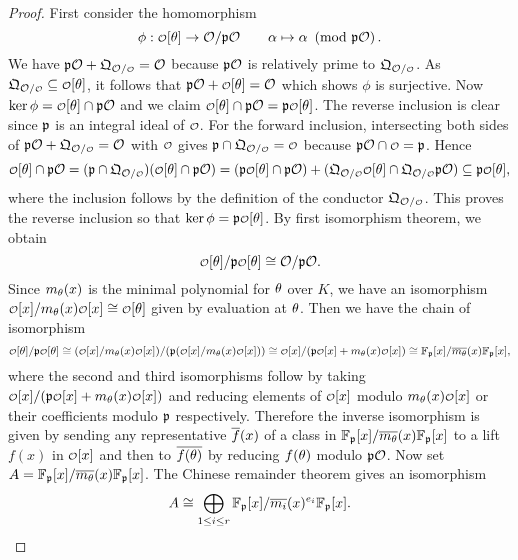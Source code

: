     \begin{proof}
      First consider the homomorphism
      \[
        \phi:\smc{O}[\t] \to \mc{O}/\mf{p}\mc{O} \qquad \a \mapsto \a \tmod{\mf{p}\mc{O}}.
      \]
      We have $\mf{p}\mc{O}+\mf{Q}_{\mc{O}/\smc{O}} = \mc{O}$ because $\mathfrak{p}\mathcal{O}$ is relatively prime to $\mf{Q}_{\mc{O}/\smc{O}}$. As $\mf{Q}_{\mc{O}/\smc{O}} \subseteq \smc{O}[\t]$, it follows that $\mf{p}\mc{O}+\smc{O}[\t] = \mc{O}$ which shows $\phi$ is surjective. Now $\ker\phi = \smc{O}[\t] \cap \mf{p}\mc{O}$ and we claim $\smc{O}[\t] \cap \mf{p}\mc{O} = \mf{p}\smc{O}[\t]$. The reverse inclusion is clear since $\mathfrak{p}$ is an integral ideal of $\smc{O}$. For the forward inclusion, intersecting both sides of $\mf{p}\mc{O}+\mf{Q}_{\mc{O}/\smc{O}} = \mc{O}$ with $\smc{O}$ gives $\mf{p} \cap \mf{Q}_{\mc{O}/\smc{O}} = \smc{O}$ because $\mf{p}\mc{O} \cap \smc{O} = \mf{p}$. Hence
      \[
        \smc{O}[\t] \cap \mf{p}\mc{O} = (\mf{p} \cap \mf{Q}_{\mc{O}/\smc{O}})(\smc{O}[\t] \cap \mf{p}\mc{O}) = (\mf{p}\smc{O}[\t] \cap \mf{p}\mc{O})+(\mf{Q}_{\mc{O}/\smc{O}}\smc{O}[\t] \cap \mf{Q}_{\mc{O}/\smc{O}}\mf{p}\mc{O}) \subseteq \mf{p}\smc{O}[\t],
      \]
      where the inclusion follows by the definition of the conductor $\mf{Q}_{\mc{O}/\smc{O}}$. This proves the reverse inclusion so that $\ker\phi = \mf{p}\smc{O}[\t]$. By first isomorphism theorem, we obtain
      \[
        \smc{O}[\t]/\mf{p}\smc{O}[\t] \cong \mc{O}/\mf{p}\mc{O}.
      \]
      Since $m_{\theta}(x)$ is the minimal polynomial for $\theta$ over $K$, we have an isomorphism $\smc{O}[x]/m_{\t}(x)\smc{O}[x] \cong \smc{O}[\t]$ given by evaluation at $\theta$. Then we have the chain of isomorphism
      \[
        \smc{O}[\t]/\mf{p}\smc{O}[\t] \cong (\smc{O}[x]/m_{\t}(x)\smc{O}[x])/(\mf{p}(\smc{O}[x]/m_{\t}(x)\smc{O}[x])) \cong \smc{O}[x]/(\mf{p}\smc{O}[x]+m_{\t}(x)\smc{O}[x]) \cong \F_{\mf{p}}[x]/\conj{m_{\t}}(x)\F_{\mf{p}}[x],
      \]
      where the second and third isomorphisms follow by taking $\smc{O}[x]/(\mf{p}\smc{O}[x]+m_{\t}(x)\smc{O}[x])$ and reducing elements of $\smc{O}[x]$ modulo $m_{\t}(x)\smc{O}[x]$ or their coefficients modulo $\mathfrak{p}$ respectively. Therefore the inverse isomorphism is given by sending any representative $\overline{f}(x)$ of a class in $\mathbb{F}_{\mathfrak{p}}[x]/\overline{m_{\theta}}(x)\mathbb{F}_{\mathfrak{p}}[x]$ to a lift $f(x)$ in $\smc{O}[x]$ and then to $\overline{f(\theta)}$ by reducing $f(\theta)$ modulo $\mathfrak{p}\mathcal{O}$. Now set $A = \mathbb{F}_{\mathfrak{p}}[x]/\overline{m_{\theta}}(x)\mathbb{F}_{\mathfrak{p}}[x]$. The Chinese remainder theorem gives an isomorphism
      \[
        A \cong \bigoplus_{1 \le i \le r}\mathbb{F}_{\mathfrak{p}}[x]/\overline{m_{i}}(x)^{e_{i}}\mathbb{F}_{\mathfrak{p}}[x].
\]
\end{proof}
